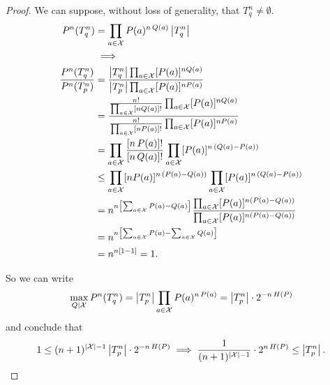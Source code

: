 \begin{proof}
	We can suppose, without loss of generality, that $T^n_q \neq \emptyset$.
	\begin{align*}
		P^n(T_q^n)
		& =
		\prod_{a \in \mathcal{X}} P(a)^{n \, Q(a)} \left|{T_q^n}\right|
		\\
		& \implies
		\\
		\frac{
			P^n(T_q^n)
		}{
			P^n(T_p^n)
		}
		& =
		\frac{
			\left|{T_q^n}\right| \prod_{a \in \mathcal{X}} [P(a)]^{n Q(a)}
		}{
			\left|{T_p^n}\right| \prod_{a \in \mathcal{X}} [P(a)]^{n P(a)}
		}
		\\
		& =
		\frac{
			\frac{n!}{\prod_{a\in\mathcal{X}} [nQ(a)]!} \prod_{a \in \mathcal{X}} [P(a)]^{n Q(a)}
		}{
			\frac{n!}{\prod_{a\in\mathcal{X}} [nP(a)]!} \prod_{a \in \mathcal{X}} [P(a)]^{n P(a)}
		}
		\\
		& =
		\prod_{a \in \mathcal{X}}
		\frac{[n \, P(a)]!}{[n \, Q(a)]!}
		\prod_{a \in \mathcal{X}}
		[P(a)]^{n \, (Q(a)-P(a))}
		\\
		& \le
		\prod_{a \in \mathcal{X}}
		[nP(a)]^{n \, (P(a)-Q(a))}
		\prod_{a \in \mathcal{X}}
		[P(a)]^{n \, (Q(a)-P(a))}
		\\
		& =
		n^{n \left[ \sum_{a \in \mathcal{X}} P(a) - Q(a) \right]}
		\frac{
			\prod_{a \in \mathcal{X}} [P(a)]^{n (P(a)-Q(a))}
		}{
			\prod_{a \in \mathcal{X}} [P(a)]^{n (P(a)-Q(a))}
		}
		\\
		& =
		n^{n \left[ \sum_{a \in \mathcal{X}} P(a) - \sum_{a \in \mathcal{X}} Q(a) \right]}
		\\
		& =
		n^{n[1-1]}
		=
		1.
	\end{align*}

	So we can write
	\begin{equation*}
		\max_{Q|\mathcal{X}} P^n(T_q^n)
		=
		\left|{T_p^n}\right| \prod_{a \in \mathcal{X}} P(a)^{n \, P(a)}
		=
		\left|{T_p^n}\right| \cdot 2^{-n \, H\left({P}\right)}
	\end{equation*}
	and conclude that
	\begin{equation*}
		1
		\le
		(n+1)^{\left|{\mathcal{X}}\right|-1} \left|{T_p^n}\right| \cdot 2^{-n \, H\left({P}\right)}
		\implies
		\frac{1}{(n+1)^{\left|{\mathcal{X}}\right|-1}} \cdot 2^{n \, H\left({P}\right)} \le \left|{T_p^n}\right|.
	\end{equation*}
\end{proof}


